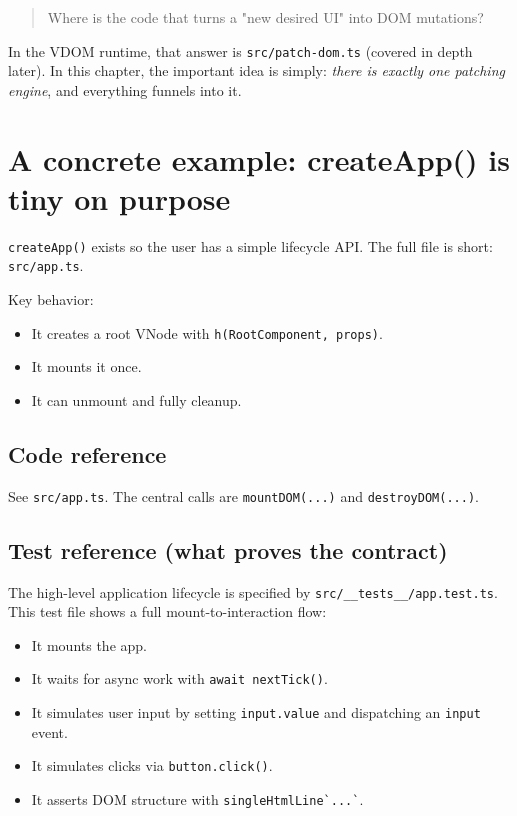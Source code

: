 \begin{quote}
Where is the code that turns a "new desired UI" into DOM mutations?
\end{quote}

In the VDOM runtime, that answer is \texttt{src/patch-dom.ts} (covered in depth later).
In this chapter, the important idea is simply: \emph{there is exactly one patching engine}, and everything funnels into it.

\section{A concrete example: createApp() is tiny on purpose}
\texttt{createApp()} exists so the user has a simple lifecycle API.
The full file is short: \texttt{src/app.ts}.

Key behavior:

\begin{itemize}
  \item It creates a root VNode with \texttt{h(RootComponent, props)}.
  \item It mounts it once.
  \item It can unmount and fully cleanup.
\end{itemize}

\subsection{Code reference}
See \texttt{src/app.ts}. The central calls are \texttt{mountDOM(...)} and \texttt{destroyDOM(...)}.

\subsection{Test reference (what proves the contract)}
The high-level application lifecycle is specified by \texttt{src/\_\_tests\_\_/app.test.ts}.
This test file shows a full mount-to-interaction flow:

\begin{itemize}
  \item It mounts the app.
  \item It waits for async work with \texttt{await nextTick()}.
  \item It simulates user input by setting \texttt{input.value} and dispatching an \texttt{input} event.
  \item It simulates clicks via \texttt{button.click()}.
  \item It asserts DOM structure with \verb|singleHtmlLine`...`|.
\end{itemize}

